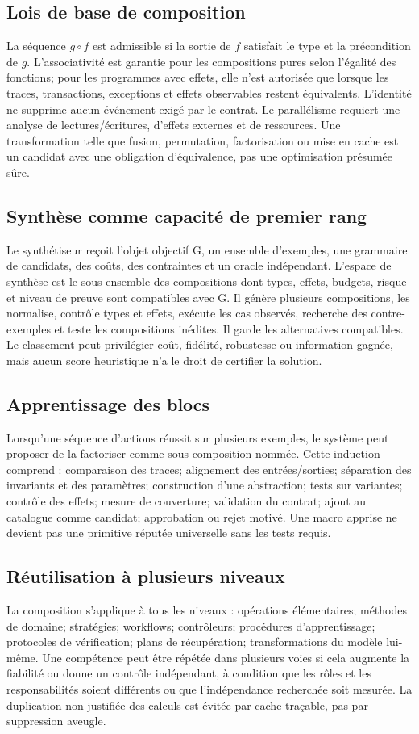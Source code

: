 \documentclass[11pt,a4paper]{article}
\begin{document}
\subsection{Lois de base de composition}
La séquence $g\circ f$ est admissible si la sortie de $f$ satisfait le type et la précondition de $g$. L'associativité est garantie pour les compositions pures selon l'égalité des fonctions; pour les programmes avec effets, elle n'est autorisée que lorsque les traces, transactions, exceptions et effets observables restent équivalents. L'identité ne supprime aucun événement exigé par le contrat. Le parallélisme requiert une analyse de lectures/écritures, d'effets externes et de ressources. Une transformation telle que fusion, permutation, factorisation ou mise en cache est un candidat avec une obligation d'équivalence, pas une optimisation présumée sûre.

\subsection{Synthèse comme capacité de premier rang}
Le synthétiseur reçoit l'objet objectif G, un ensemble d'exemples, une grammaire de candidats, des coûts, des contraintes et un oracle indépendant. L'espace de synthèse est le sous-ensemble des compositions dont types, effets, budgets, risque et niveau de preuve sont compatibles avec G. Il génère plusieurs compositions, les normalise, contrôle types et effets, exécute les cas observés, recherche des contre-exemples et teste les compositions inédites. Il garde les alternatives compatibles. Le classement peut privilégier coût, fidélité, robustesse ou information gagnée, mais aucun score heuristique n'a le droit de certifier la solution.

\subsection{Apprentissage des blocs}
Lorsqu'une séquence d'actions réussit sur plusieurs exemples, le système peut proposer de la factoriser comme sous-composition nommée. Cette induction comprend : comparaison des traces; alignement des entrées/sorties; séparation des invariants et des paramètres; construction d'une abstraction; tests sur variantes; contrôle des effets; mesure de couverture; validation du contrat; ajout au catalogue comme candidat; approbation ou rejet motivé. Une macro apprise ne devient pas une primitive réputée universelle sans les tests requis.

\subsection{Réutilisation à plusieurs niveaux}
La composition s'applique à tous les niveaux : opérations élémentaires; méthodes de domaine; stratégies; workflows; contrôleurs; procédures d'apprentissage; protocoles de vérification; plans de récupération; transformations du modèle lui-même. Une compétence peut être répétée dans plusieurs voies si cela augmente la fiabilité ou donne un contrôle indépendant, à condition que les rôles et les responsabilités soient différents ou que l'indépendance recherchée soit mesurée. La duplication non justifiée des calculs est évitée par cache traçable, pas par suppression aveugle.
\end{document}
